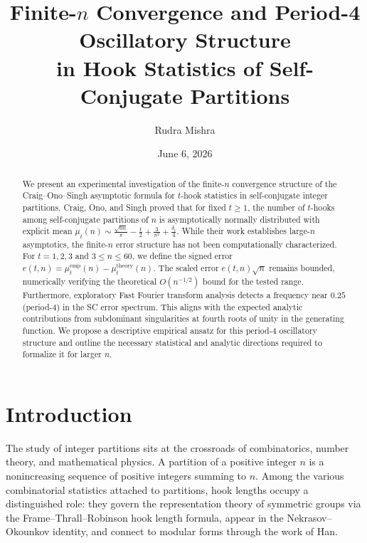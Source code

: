 \documentclass[11pt,reqno]{amsart}
\title{Finite-$n$ Convergence and Period-4 Oscillatory Structure\\
in Hook Statistics of Self-Conjugate Partitions}
\author{Rudra Mishra}
\date{June 6, 2026}
\begin{document}
\begin{abstract}
We present an experimental investigation of the finite-$n$ 
convergence structure of the Craig--Ono--Singh asymptotic formula 
for $t$-hook statistics in self-conjugate integer partitions. 
Craig, Ono, and Singh proved that for fixed $t \geq 1$, the number 
of $t$-hooks among self-conjugate partitions of $n$ is 
asymptotically normally distributed with explicit mean 
$\mu_t(n) \sim \frac{\sqrt{6n}}{\pi} - \frac{t}{2} + 
\frac{3}{\pi^2} + \frac{\delta_t}{4}$. 
While their work establishes large-$n$ asymptotics, the 
finite-$n$ error structure has not been computationally 
characterized. For $t = 1, 2, 3$ and $3 \leq n \leq 60$, 
we define the signed error $e(t,n) = \mu_t^{\mathrm{emp}}(n) - 
\mu_t^{\mathrm{theory}}(n)$. The scaled error $e(t,n)\sqrt{n}$ 
remains bounded, numerically verifying the theoretical $O(n^{-1/2})$ bound 
for the tested range. Furthermore, exploratory Fast Fourier transform analysis 
detects a frequency near $0.25$ (period-4) in the SC error spectrum. This aligns 
with the expected analytic contributions from subdominant singularities at fourth 
roots of unity in the generating function. We propose a descriptive empirical 
ansatz for this period-4 oscillatory structure and outline the necessary statistical 
and analytic directions required to formalize it for larger $n$.
\end{abstract}

\maketitle

\tableofcontents

\section{Introduction}

The study of integer partitions sits at the crossroads of 
combinatorics, number theory, and mathematical physics. 
A partition of a positive integer $n$ is a nonincreasing 
sequence of positive integers summing to $n$. Among the 
various combinatorial statistics attached to partitions, 
hook lengths occupy a distinguished role: they govern the 
representation theory of symmetric groups via the 
Frame--Thrall--Robinson hook length formula, appear in the 
Nekrasov--Okounkov identity, and connect to modular forms 
through the work of Han.
\end{document}
